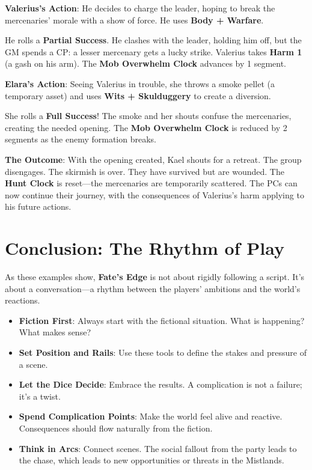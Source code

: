\textbf{Valerius's Action}: He decides to charge the leader, hoping to break the mercenaries' morale with a show of force. He uses \textbf{Body + Warfare}.

He rolls a \textbf{Partial Success}. He clashes with the leader, holding him off, but the GM spends a CP: a lesser mercenary gets a lucky strike. Valerius takes \textbf{Harm 1} (a gash on his arm). The \textbf{Mob Overwhelm Clock} advances by 1 segment.

\textbf{Elara's Action}: Seeing Valerius in trouble, she throws a smoke pellet (a temporary asset) and uses \textbf{Wits + Skulduggery} to create a diversion.

She rolls a \textbf{Full Success}! The smoke and her shouts confuse the mercenaries, creating the needed opening. The \textbf{Mob Overwhelm Clock} is reduced by 2 segments as the enemy formation breaks.

\textbf{The Outcome}: With the opening created, Kael shouts for a retreat. The group disengages. The skirmish is over. They have survived but are wounded. The \textbf{Hunt Clock} is reset—the mercenaries are temporarily scattered. The PCs can now continue their journey, with the consequences of Valerius's harm applying to his future actions.

\section*{Conclusion: The Rhythm of Play}

As these examples show, \textbf{Fate's Edge} is not about rigidly following a script. It's about a conversation—a rhythm between the players' ambitions and the world's reactions.

\begin{tcolorbox}[title=The GM's Mantra, colback=green!5!white, colframe=green!75!black, fonttitle=\bfseries]
\begin{itemize}
    \item \textbf{Fiction First}: Always start with the fictional situation. What is happening? What makes sense?
    \item \textbf{Set Position and Rails}: Use these tools to define the stakes and pressure of a scene.
    \item \textbf{Let the Dice Decide}: Embrace the results. A complication is not a failure; it's a twist.
    \item \textbf{Spend Complication Points}: Make the world feel alive and reactive. Consequences should flow naturally from the fiction.
    \item \textbf{Think in Arcs}: Connect scenes. The social fallout from the party leads to the chase, which leads to new opportunities or threats in the Mistlands.
\end{itemize}
\end{tcolorbox}

